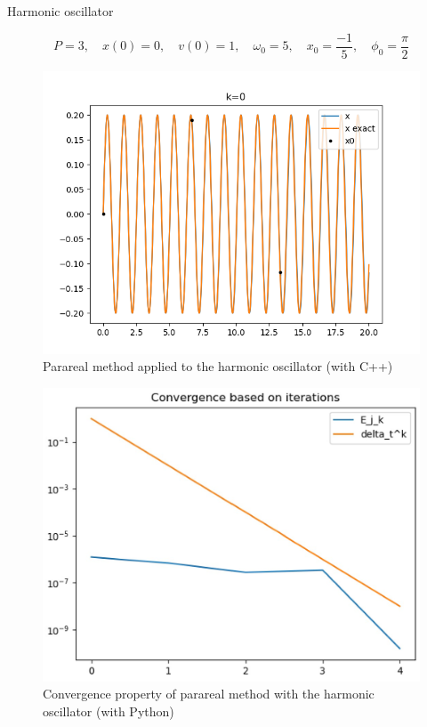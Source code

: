 \begin{frame}{Harmonic oscillator}
	
	$$P=3, \quad x(0)=0,\quad v(0)=1, \quad\omega_0=5, \quad x_0=\frac{-1}{5}, \quad \phi_0=\frac{\pi}{2}$$
	
	\begin{minipage}{0.45\linewidth}
		\begin{figure}
			\centering
			\includegraphics[width=\linewidth]{"images/parareal/osci_sol.png"}
			\caption{Parareal method applied to the harmonic oscillator (with C++)}
		\end{figure}
	\end{minipage} \; \qquad
	\begin{minipage}{0.45\linewidth}
		\begin{figure}
			\centering
			\includegraphics[width=\linewidth]{"images/parareal/osci_cvg_1.jpg"}
			\caption{Convergence property of parareal method with the harmonic oscillator (with Python)}
		\end{figure}
	\end{minipage}
	
\end{frame}

